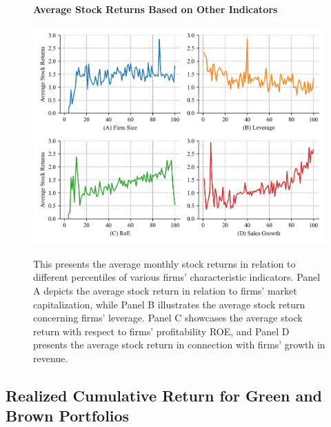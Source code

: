 \documentclass[12pt]{article}
\begin{document}
\begin{figure}[!ht]
\centering
\caption{\textbf{Average Stock Returns Based on Other Indicators}}
\includegraphics{graphics/other_percentile.png}
\label{fig: others_persentile}
\caption*{\footnotesize{This presents the average monthly stock returns in relation to different percentiles of various firms' characteristic indicators. Panel A depicts the average stock return in relation to firms' market capitalization, while Panel B illustrates the average stock return concerning firms' leverage. Panel C showcases the average stock return with respect to firms' profitability ROE, and Panel D presents the average stock return in connection with firms' growth in revenue.}}
\end{figure}


\subsection{Realized Cumulative Return for Green and Brown Portfolios}
\end{document}
